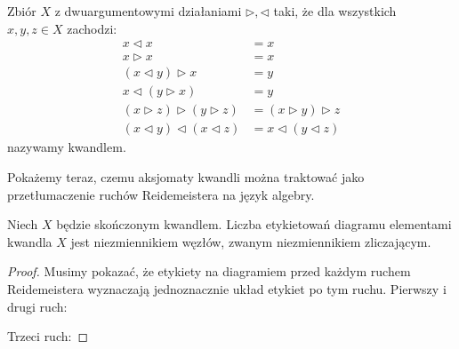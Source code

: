 \begin{definition}
    Zbiór $X$ z dwuargumentowymi działaniami $\triangleright, \triangleleft$ taki, że dla wszystkich $x, y, z \in X$ zachodzi:
    \begin{align}
    x \triangleleft x & = x \\
    x \triangleright x & = x \\
    (x \triangleleft y) \triangleright x & = y \\
    x \triangleleft (y \triangleright x) & = y \\
     (x \triangleright z) \triangleright (y \triangleright z) & = (x \triangleright y) \triangleright z \\
    (x \triangleleft y) \triangleleft (x \triangleleft z) & = x \triangleleft (y \triangleleft z)
    \end{align}
    nazywamy kwandlem.
\end{definition}

Pokażemy teraz, czemu aksjomaty kwandli można traktować jako przetłumaczenie ruchów Reidemeistera na język algebry.
%

\begin{proposition}
%
    Niech $X$ będzie skończonym kwandlem.
    Liczba etykietowań diagramu elementami kwandla $X$ jest niezmiennikiem węzłów, zwanym niezmiennikiem zliczającym.
\end{proposition}
    
\begin{proof}
    Musimy pokazać, że etykiety na diagramiem przed każdym ruchem Reidemeistera wyznaczają jednoznacznie układ etykiet po tym ruchu.
    Pierwszy i drugi ruch:
\begin{comment}
    \begin{figure}[H]
        \begin{minipage}[b]{.48\linewidth}
        \[
            \LargeReidemeisterOneRightQuandleProof
            \stackrel{R_1}{\cong}
            \LargeReidemeisterOneStraightQuandleProof
        \]
        \end{minipage}
        \begin{minipage}[b]{.48\linewidth}
        \[
            \LargeReidemeisterTwoQuandleA \cong \LargeReidemeisterTwoQuandleB
        \]
        \end{minipage}
    \end{figure}
\end{comment}
    Trzeci ruch:
\begin{comment}
    \[
        \LargeReidemeisterThreeQuandleA \cong \LargeReidemeisterThreeQuandleB \qedhere
    \]
\end{comment}
\end{proof}

